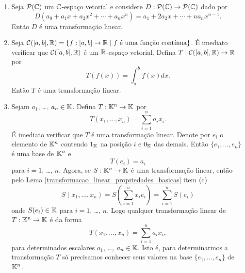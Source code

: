 \begin{exemplo}
\begin{enumerate}[label={\arabic*})]
		\item Seja $\mathcal{P}(\mathbb{C})$ um $\mathbb{C}$-espa\c{c}o vetorial e considere $D : \mathcal{P}(\mathbb{C}) \to \mathcal{P}(\mathbb{C})$ dado por
		\[
			D(a_0 + a_1x + a_2x^2 + \cdots + a_nx^n) = a_1 + 2a_2x + \cdots + na_nx^{n-1}.
		\]
		Ent\~ao $D$ \'e uma transforma\c{c}\~ao linear.

		\item Seja $\mathcal{C}([a,b], \real) = \{ f : [a,b] \to \real \mid f \mbox{ \'e uma fun\c{c}\~ao cont{\'\i}nua}\}$. \'E imediato verificar que $\mathcal{C}([a,b], \mathbb{R})$ \'e um $\mathbb{R}$-espa\c{c}o vetorial. Defina $T : \mathcal{C}([a,b], \mathbb{R}) \to \mathbb{R}$ por
		\[
			T(f(x)) = \int_a^bf(x)dx.
		\]
		Ent\~ao $T$ \'e uma transforma\c{c}\~ao linear.

		\item Sejam $a_1$, \dots, $a_n \in \mathbb{K}$. Defina $T : \mathbb{K}^n \to \mathbb{K}$ por
		\[
			T(x_1, \dots, x_n) = \sum_{i=1}^na_ix_i.
		\]
		\'E imediato verificar que $T$ \'e uma transforma\c{c}\~ao linear. Denote por $e_i$ o elemento de $\mathbb{K}^n$ contendo $1_{\mathbb{K}}$ na posi\c{c}\~ao $i$ e $0_{\mathbb{K}}$ das demais. Ent\~ao $\{e_1, \dots, e_n\}$ \'e uma base de $\mathbb{K}^n$ e
		\[
			T(e_i) = a_i
		\]
		para $i = 1$, \dots, $n$. Agora, se $S : \mathbb{K}^n \to \mathbb{K}$ \'e uma transforma\c{c}\~ao linear, ent\~ao pelo Lema \ref{transformacao_linear_propriedades_basicas} item (c)
		\[
			S(x_1, \dots, x_n) = S(\sum_{i=1}^nx_ie_i) = \sum_{i=1}^nS(e_i)
		\]
		onde $S(e_i) \in \mathbb{K}$ para $i = 1$, \dots, $n$. Logo qualquer transforma\c{c}\~ao linear de $T : \mathbb{K}^n \to \mathbb{K}$ \'e da forma
		\[
			T(x_1, \dots, x_n) = \sum_{i=1}^na_ix_i,
		\]
		para determinados escalares $a_1$, \dots, $a_n \in \mathbb{K}$. Isto \'e, para determinarmos a transforma\c{c}\~ao $T$ s\'o precisamos conhecer seus valores na base $\{e_1, \dots, e_n\}$ de $\mathbb{K}^n$.
	\end{enumerate}
\end{exemplo}

